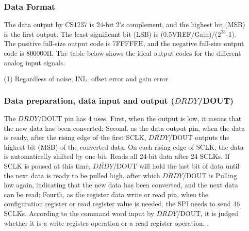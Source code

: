 \documentclass{article}
\begin{document}
\subsubsection{Data Format}

The data output by CS1237 is 24-bit 2's complement, and the highest bit (MSB) is the first output.
The least significant bit (LSB) is (0.5VREF/Gain)/($2^{23}$-1).
The positive full-size output code is 7FFFFFH, and the negative full-size output code is 800000H.
The table below shows the ideal output codes for the different analog input signals.

\begin{table}[h]
    \caption{Ideal output code and input signal (1)}
    \label{tab:table7}
\end{table}

(1) Regardless of noise, INL, offset error and gain error

\subsubsection{Data preparation, data input and output ($\overline{DRDY}$/DOUT)}

The $\overline{DRDY}$/DOUT pin has 4 uses.
First, when the output is low, it means that the new data has been converted;
Second, as the data output pin, when the data is ready, after the rising edge of the first SCLK, $\overline{DRDY}$/DOUT outputs the highest bit (MSB) of the converted data.
On each rising edge of SCLK, the data is automatically shifted by one bit.
Reads all 24-bit data after 24 SCLKs. 
If SCLK is paused at this time, $\overline{DRDY}$/DOUT will hold the last bit of data until the next data is ready to be pulled high, after which $\overline{DRDY}$/DOUT is Pulling low again, indicating that the new data has been converted, and the next data can be read;
Fourth, as the register data write or read pin, when the configuration register or read register value is needed, the SPI needs to send 46 SCLKs. 
According to the command word input by $\overline{DRDY}$/DOUT, it is judged whether it is a write register operation or a read register operation. .
\end{document}
